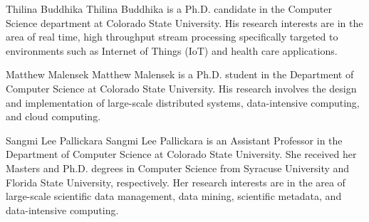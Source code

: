 \documentclass[9pt,journal,compsoc]{IEEEtran}
\begin{document}


\vspace*{-5\baselineskip}
\begin{IEEEbiography}{Thilina Buddhika}
Thilina Buddhika is a Ph.D. candidate in the Computer Science department at Colorado State University.  His research interests are in the area of real time, high throughput stream processing specifically targeted to environments such as Internet of Things (IoT) and health care applications.
\end{IEEEbiography}
\vspace{-2cm}
\begin{IEEEbiography}{Matthew Malensek}
Matthew Malensek is a Ph.D. student in the Department of Computer Science at Colorado State University. His research involves the design and implementation of large-scale distributed systems, data-intensive computing, and cloud computing.
\end{IEEEbiography}
%
\vspace{-2cm}
\begin{IEEEbiography}{Sangmi Lee Pallickara}
Sangmi Lee Pallickara is an Assistant Professor in the Department of Computer Science at Colorado State University. She received her Masters and Ph.D. degrees in Computer Science from Syracuse University and Florida State University, respectively. Her research interests are in the area of large-scale scientific data management, data mining, scientific metadata, and data-intensive computing.
\end{IEEEbiography}
\end{document}

